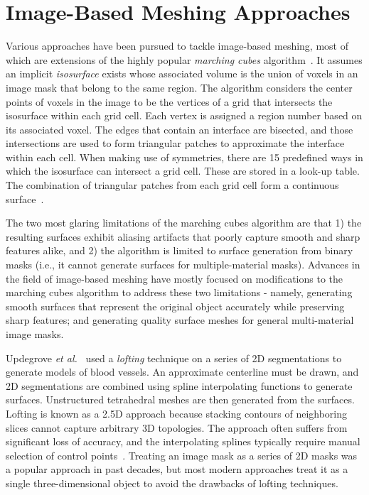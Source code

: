 \section{Image-Based Meshing Approaches}
\label{Image-Based Meshing Approaches}

Various approaches have been pursued to tackle image-based meshing, most of which are extensions of the highly popular \textit{marching cubes} algorithm~\cite{lorensen_1987}. It assumes an implicit \textit{isosurface} exists whose associated volume is the union of voxels in an image mask that belong to the same region. The algorithm considers the center points of voxels in the image to be the vertices of a grid that intersects the isosurface within each grid cell. Each vertex is assigned a region number based on its associated voxel. The edges that contain an interface are bisected, and those intersections are used to form triangular patches to approximate the interface within each cell. When making use of symmetries, there are 15 predefined ways in which the isosurface can intersect a grid cell. These are stored in a look-up table. The combination of triangular patches from each grid cell form a continuous surface~\cite{young_2008}.

The two most glaring limitations of the marching cubes algorithm are that 1) the resulting surfaces exhibit aliasing artifacts that poorly capture smooth and sharp features alike, and 2) the algorithm is limited to surface generation from binary masks (i.e., it cannot generate surfaces for multiple-material masks). Advances in the field of image-based meshing have mostly focused on modifications to the marching cubes algorithm to address these two limitations - namely, generating smooth surfaces that represent the original object accurately while preserving sharp features; and generating quality surface meshes for general multi-material image masks.

Updegrove \textit{et al.}~\cite{updegrove_2016} used a \textit{lofting} technique on a series of 2D segmentations to generate models of blood vessels. An approximate centerline must be drawn, and 2D segmentations are combined using spline interpolating functions to generate surfaces. Unstructured tetrahedral meshes are then generated from the surfaces. Lofting is known as a 2.5D approach because stacking contours of neighboring slices cannot capture arbitrary 3D topologies. The approach often suffers from significant loss of accuracy, and the interpolating splines typically require manual selection of control points~\cite{young_2008}. Treating an image mask as a series of 2D masks was a popular approach in past decades, but most modern approaches treat it as a single three-dimensional object to avoid the drawbacks of lofting techniques.

